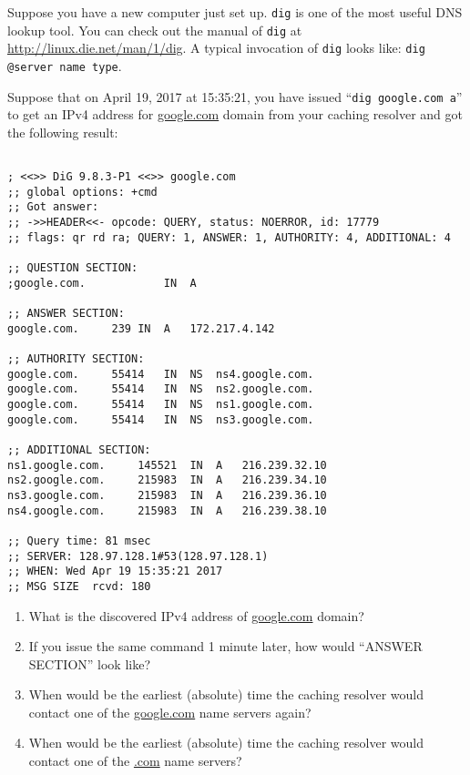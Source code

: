\documentclass{report}
\begin{document}
\mktitle


\begin{problem}

Suppose you have a new computer just set up. \verb|dig| is one of the most
useful DNS lookup tool.
You can check out the manual of \verb|dig| at \url{http://linux.die.net/man/1/dig}.
A typical invocation of \verb|dig| looks like:
\verb|dig @server name type|.

Suppose that on April 19, 2017 at 15:35:21, you have issued
``\verb|dig google.com a|'' to get an IPv4 address for \url{google.com} domain
from your caching resolver and got the following result:

\begin{lstlisting}

; <<>> DiG 9.8.3-P1 <<>> google.com
;; global options: +cmd
;; Got answer:
;; ->>HEADER<<- opcode: QUERY, status: NOERROR, id: 17779
;; flags: qr rd ra; QUERY: 1, ANSWER: 1, AUTHORITY: 4, ADDITIONAL: 4

;; QUESTION SECTION:
;google.com.			IN	A

;; ANSWER SECTION:
google.com.		239	IN	A	172.217.4.142

;; AUTHORITY SECTION:
google.com.		55414	IN	NS	ns4.google.com.
google.com.		55414	IN	NS	ns2.google.com.
google.com.		55414	IN	NS	ns1.google.com.
google.com.		55414	IN	NS	ns3.google.com.

;; ADDITIONAL SECTION:
ns1.google.com.		145521	IN	A	216.239.32.10
ns2.google.com.		215983	IN	A	216.239.34.10
ns3.google.com.		215983	IN	A	216.239.36.10
ns4.google.com.		215983	IN	A	216.239.38.10

;; Query time: 81 msec
;; SERVER: 128.97.128.1#53(128.97.128.1)
;; WHEN: Wed Apr 19 15:35:21 2017
;; MSG SIZE  rcvd: 180

\end{lstlisting}

\begin{enumerate}

\item What is the discovered IPv4 address of \url{google.com} domain?

\item If you issue the same command 1 minute later, how would
      ``ANSWER SECTION'' look like?

\item When would be the earliest (absolute) time the caching resolver would
      contact one of the \url{google.com} name servers again?

\item When would be the earliest (absolute) time the caching resolver would
      contact one of the \url{.com} name servers?


\end{enumerate}
\end{problem}
\end{document}
